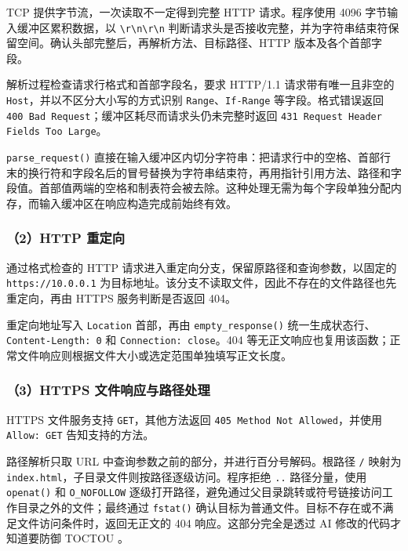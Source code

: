 \documentclass[UTF8,11pt,a4paper,fontset=fandol]{ctexart}
\begin{document}
TCP 提供字节流，一次读取不一定得到完整 HTTP 请求。程序使用 4096 字节输入缓冲区累积数据，以 \texttt{\textbackslash{}r\textbackslash{}n\textbackslash{}r\textbackslash{}n} 判断请求头是否接收完整，并为字符串结束符保留空间。确认头部完整后，再解析方法、目标路径、HTTP 版本及各个首部字段。


解析过程检查请求行格式和首部字段名，要求 HTTP/1.1 请求带有唯一且非空的 \texttt{Host}，并以不区分大小写的方式识别 \texttt{Range}、\texttt{If-Range} 等字段。格式错误返回 \texttt{400 Bad Request}；缓冲区耗尽而请求头仍未完整时返回 \texttt{431 Request Header Fields Too Large}。


\texttt{parse\_\allowbreak{}request(\allowbreak{})\allowbreak{}} 直接在输入缓冲区内切分字符串：把请求行中的空格、首部行末的换行符和字段名后的冒号替换为字符串结束符，再用指针引用方法、路径和字段值。首部值两端的空格和制表符会被去除。这种处理无需为每个字段单独分配内存，而输入缓冲区在响应构造完成前始终有效。


\subsubsection*{（2）HTTP 重定向}

通过格式检查的 HTTP 请求进入重定向分支，保留原路径和查询参数，以固定的 \texttt{https:/\allowbreak{}/\allowbreak{}10.0.0.1} 为目标地址。该分支不读取文件，因此不存在的文件路径也先重定向，再由 HTTPS 服务判断是否返回 404。


重定向地址写入 \texttt{Location} 首部，再由 \texttt{empty\_\allowbreak{}response(\allowbreak{})\allowbreak{}} 统一生成状态行、\texttt{Content-Length: 0} 和 \texttt{Connection: close}。404 等无正文响应也复用该函数；正常文件响应则根据文件大小或选定范围单独填写正文长度。


\subsubsection*{（3）HTTPS 文件响应与路径处理}

HTTPS 文件服务支持 \texttt{GET}，其他方法返回 \texttt{405 Method Not Allowed}，并使用 \texttt{Allow: GET} 告知支持的方法。


路径解析只取 URL 中查询参数之前的部分，并进行百分号解码。根路径 \texttt{/\allowbreak{}} 映射为 \texttt{index.html}，子目录文件则按路径逐级访问。程序拒绝 \texttt{..} 路径分量，使用 \texttt{openat(\allowbreak{})\allowbreak{}} 和 \texttt{O\_\allowbreak{}NOFOLLOW} 逐级打开路径，避免通过父目录跳转或符号链接访问工作目录之外的文件；最终通过 \texttt{fstat(\allowbreak{})\allowbreak{}} 确认目标为普通文件。目标不存在或不满足文件访问条件时，返回无正文的 404 响应。这部分完全是透过 AI 修改的代码才知道要防御 TOCTOU 。
\end{document}
